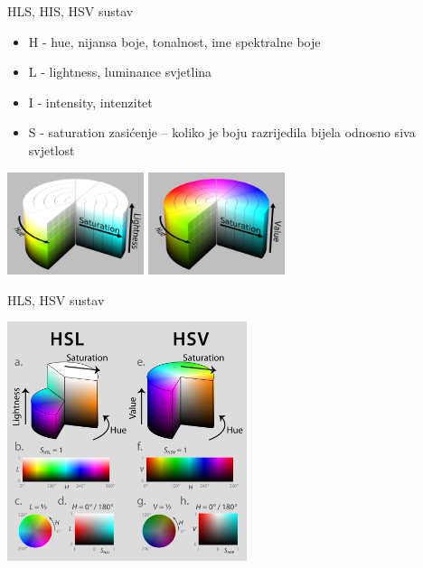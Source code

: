 \documentclass[9pt]{beamer}
\begin{document}
\begin{frame}{HLS, HIS, HSV sustav}
	\begin{itemize}
		\item H - hue, nijansa boje, tonalnost, ime spektralne boje
		\item L - lightness, luminance svjetlina
		\item I - intensity, intenzitet
		\item S - saturation zasićenje – koliko je boju
		razrijedila bijela odnosno siva svjetlost
	\end{itemize}
	\begin{center}
		\includegraphics[height=3cm]{slike/04-hsl_color_solid_cylinder_alpha_lowgamma.png}
		\includegraphics[height=3cm]{slike/04-hsv_color_solid_cylinder_alpha_lowgamma.png}
	\end{center}
\end{frame}

\begin{frame}{HLS, HSV sustav}
	\begin{center}
		\includegraphics[height=7cm]{slike/04_hsl-hsv_models.png}
	\end{center}
\end{frame}
\end{document}
